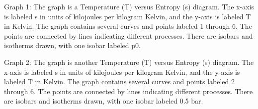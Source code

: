 Graph 1:
The graph is a Temperature (T) versus Entropy (s) diagram. The x-axis is labeled s in units of kilojoules per kilogram Kelvin, and the y-axis is labeled T in Kelvin. The graph contains several curves and points labeled 1 through 6. The points are connected by lines indicating different processes. There are isobars and isotherms drawn, with one isobar labeled p0.

Graph 2:
The graph is another Temperature (T) versus Entropy (s) diagram. The x-axis is labeled s in units of kilojoules per kilogram Kelvin, and the y-axis is labeled T in Kelvin. The graph contains several curves and points labeled 2 through 6. The points are connected by lines indicating different processes. There are isobars and isotherms drawn, with one isobar labeled 0.5 bar.